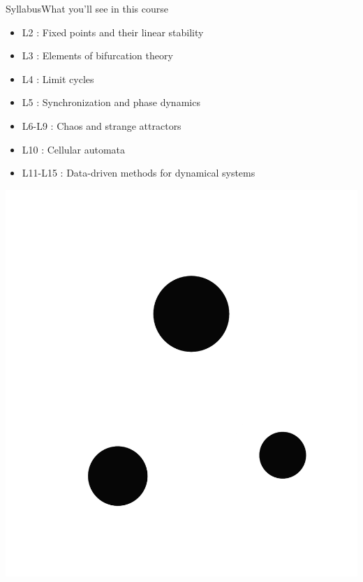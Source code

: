 \documentclass[usenames,dvipsnames,svgnames,10pt,aspectratio=169]{beamer}
\begin{document}
\begin{frame}[t, c]{Syllabus}{What you'll see in this course}
  \begin{minipage}{.68\textwidth}
    \begin{itemize}
    \item L2 : Fixed points and their linear stability
      \medskip
    \item L3 : Elements of bifurcation theory
      \medskip
    \item L4 : Limit cycles
      \medskip
    \item L5 : Synchronization and phase dynamics
      \medskip
    \item L6-L9 : Chaos and strange attractors
      \medskip
    \item L10 : Cellular automata
      \medskip
    \item L11-L15 : Data-driven methods for dynamical systems
    \end{itemize}
  \end{minipage}%
  \hfill
  \begin{minipage}{.28\textwidth}
    \centering
    \includegraphics[width=\textwidth]{Gears}
  \end{minipage}

  \vspace{1cm}
\end{frame}
\end{document}
